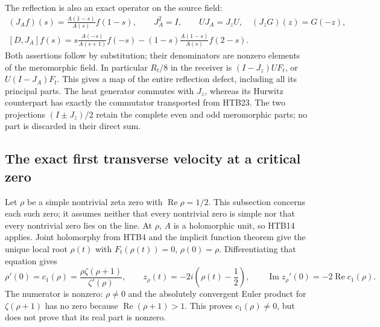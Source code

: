The reflection is also an exact operator on the source field:
\begin{equation}\tag{HTB23}
\begin{gathered}
 (J_A f)(s)=\frac{A(1-s)}{A(s)}f(1-s),\qquad J_A^2=I,
 \qquad UJ_A=J_zU,\quad (J_zG)(z)=G(-z),\\
 [D,J_A]f(s)
 =s\frac{A(-s)}{A(s+1)}f(-s)
 -(1-s)\frac{A(1-s)}{A(s)}f(2-s).
\end{gathered}
\end{equation}
Both assertions follow by substitution; their denominators are nonzero
elements of the meromorphic field. In particular
$R_t/8$ in the receiver is $(I-J_z)UF_t$, or $U(I-J_A)F_t$.
This gives a map of the entire reflection defect, including all its
principal parts. The heat generator commutes with $J_z$, whereas its
Hurwitz counterpart has exactly the commutator transported from
HTB23. The two projections $(I\pm J_z)/2$ retain the complete even
and odd meromorphic parts; no part is discarded in their direct sum.

\subsection{The exact first transverse velocity at a critical zero}

Let $\rho$ be a simple nontrivial zeta zero with
$\operatorname{Re}\rho=1/2$. This subsection concerns each such zero;
it assumes neither that every nontrivial zero is simple nor that every
nontrivial zero lies on the line. At $\rho$, $A$ is a holomorphic unit,
so HTB14 applies. Joint holomorphy from HTB4 and the implicit function
theorem give the unique local root $\rho(t)$ with
$F_t(\rho(t))=0$, $\rho(0)=\rho$. Differentiating that equation gives
\begin{equation}\tag{HTB24}
 \rho'(0)=c_1(\rho)
 =\frac{\rho\zeta(\rho+1)}{\zeta'(\rho)},\qquad
 z_\rho(t)=-2i\left(\rho(t)-\frac12\right),\qquad
 \operatorname{Im}z_\rho'(0)=-2\operatorname{Re}c_1(\rho).
\end{equation}
The numerator is nonzero: $\rho\ne0$ and the absolutely convergent
Euler product for $\zeta(\rho+1)$ has no zero because
$\operatorname{Re}(\rho+1)>1$. This proves $c_1(\rho)\ne0$, but does
not prove that its real part is nonzero.


